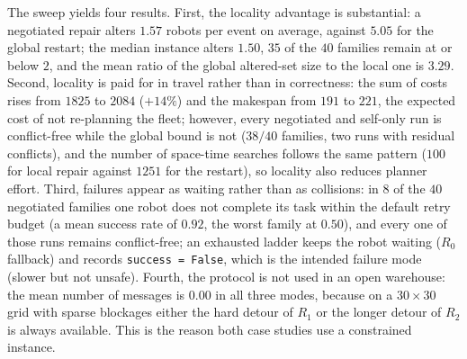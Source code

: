 \documentclass[10pt,a4paper]{article}
\newcommand{\code}[1]{\texttt{#1}}
\begin{document}
The sweep yields four results.  First, the locality advantage is substantial:
a negotiated repair alters $1.57$ robots per event on average, against $5.05$
for the global restart; the median instance alters $1.50$, $35$ of the $40$
families remain at or below $2$, and the mean ratio of the global altered-set
size to the local one is $3.29$.  Second, locality is paid for in travel
rather than in correctness: the sum of costs rises from $1825$ to $2084$
($+14\%$) and the makespan from $191$ to $221$, the expected cost of not
re-planning the fleet; however, every negotiated and self-only run is
conflict-free while the global bound is not ($38/40$ families, two runs with
residual conflicts), and the number of space-time searches follows the same
pattern ($100$ for local repair against $1251$ for the restart), so locality
also reduces planner effort.  Third, failures appear as waiting rather than
as collisions: in $8$ of the $40$ negotiated families one robot does not
complete its task within the default retry budget (a mean success rate of
$0.92$, the worst family at $0.50$), and every one of those runs remains
conflict-free; an exhausted ladder keeps the robot waiting ($R_0$ fallback)
and records \code{success = False}, which is the intended failure mode
(slower but not unsafe).  Fourth, the protocol is not used in an open
warehouse: the mean number of messages is $0.00$ in all three modes, because
on a $30\times30$ grid with sparse blockages either the hard detour of $R_1$
or the longer detour of $R_2$ is always available.  This is the reason both
case studies use a constrained instance.
\end{document}
